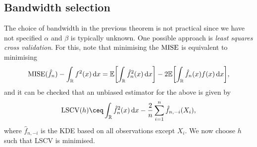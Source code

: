 \subsection{Bandwidth selection}
The choice of bandwidth in the previous theorem is not practical since we have not specified $\alpha$ and $\beta$ is typically unknown. One possible approach is \emph{least squares cross validation}. For this, note that minimising the $\operatorname{MISE}$ is equivalent to minimising
\[
\operatorname{MISE}(\hat f_n) - \int_\mathbb R f^2(x) \dd{x} = \mathbb E\qty[ \int_\mathbb R \hat f_n^2(x) \dd{x}] - 2\mathbb E\qty[ \int_\mathbb R \hat f_n(x) f(x) \dd{x}],
\]
and it can be checked that an unbiased estimator for the above is given by 
\[
\Rm{LSCV}(h) \ceq \int_\RR \hat f_n^2(x) \dd{x} - \frac2n \sum_{i=1}^n \hat f_{n, -i}(X_i),
\]
where $\hat f_{n, -i}$ is the KDE based on all observations except $X_i$. We now choose $h$ such that LSCV is minimised. 